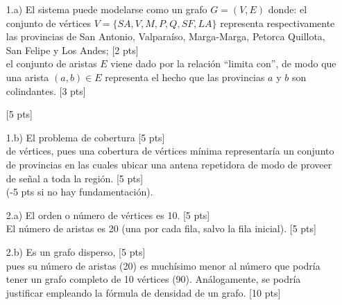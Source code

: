 \documentclass[letter,12pt,oneside]{book}
\theoremstyle{definition}
\begin{document}
\begin{enumerate}
    \item[1.a)] El sistema puede modelarse como un grafo $G=(V,E)$ donde: el conjunto de vértices $V=\{SA,V,M,P,Q,SF,LA\}$ representa respectivamente las provincias de San Antonio, Valparaíso, Marga-Marga, Petorca Quillota, San Felipe y Los Andes; \tabto{87ex} [2 pts]\\
    el conjunto de aristas $E$ viene dado por la relación ``limita con'', de modo que una arista $(a,b)\in E$ representa el hecho que las provincias $a$ y $b$ son colindantes. \tabto{87ex} [3 pts]
\begin{center}
\end{center}
\tabto{87ex} [5 pts]

    \item[1.b)] El problema de cobertura \tabto{87ex} [5 pts]\\
    de vértices, pues una cobertura de vértices mínima representaría un conjunto de provincias en las cuales ubicar una antena repetidora de modo de proveer de señal a toda la región.\tabto{87ex} [5 pts]\\
    (-5 pts si no hay fundamentación).
    
    \item[2.a)] El orden o número de vértices es 10. \tabto{87ex} [5 pts]\\
    El número de aristas es 20 (una por cada fila, salvo la fila inicial).\tabto{87ex} [5 pts]

    \item[2.b)] Es un grafo disperso, \tabto{87ex} [5 pts]\\
    pues su número de aristas (20) es muchísimo menor al número que podría tener un grafo completo de 10 vértices (90). Análogamente, se podría justificar empleando la fórmula de densidad de un grafo.\tabto{86ex} [10 pts]


\end{enumerate}
\end{document}

